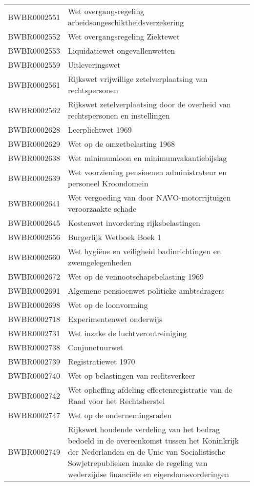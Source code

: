 \begin{longtable}{lp{}}
BWBR0002551 & Wet overgangsregeling arbeidsongeschiktheidsverzekering \\
BWBR0002552 & Wet overgangsregeling Ziektewet \\
BWBR0002553 & Liquidatiewet ongevallenwetten \\
BWBR0002559 & Uitleveringswet \\
BWBR0002561 & Rijkswet vrijwillige zetelverplaatsing van rechtspersonen \\
BWBR0002562 & Rijkswet zetelverplaatsing door de overheid van rechtspersonen en instellingen \\
BWBR0002628 & Leerplichtwet 1969 \\
BWBR0002629 & Wet op de omzetbelasting 1968 \\
BWBR0002638 & Wet minimumloon en minimumvakantiebijslag \\
BWBR0002639 & Wet voorziening pensioenen administrateur en personeel Kroondomein \\
BWBR0002641 & Wet vergoeding van door NAVO-motorrijtuigen veroorzaakte schade \\
BWBR0002645 & Kostenwet invordering rijksbelastingen \\
BWBR0002656 & Burgerlijk Wetboek Boek 1 \\
BWBR0002660 & Wet hygiëne en veiligheid badinrichtingen en zwemgelegenheden \\
BWBR0002672 & Wet op de vennootschapsbelasting 1969 \\
BWBR0002691 & Algemene pensioenwet politieke ambtsdragers \\
BWBR0002698 & Wet op de loonvorming \\
BWBR0002718 & Experimentenwet onderwijs \\
BWBR0002731 & Wet inzake de luchtverontreiniging \\
BWBR0002738 & Conjunctuurwet \\
BWBR0002739 & Registratiewet 1970 \\
BWBR0002740 & Wet op belastingen van rechtsverkeer \\
BWBR0002742 & Wet opheffing afdeling effectenregistratie van de Raad voor het Rechtsherstel \\
BWBR0002747 & Wet op de ondernemingsraden \\
BWBR0002749 & Rijkswet houdende verdeling van het bedrag bedoeld in de overeenkomst tussen het Koninkrijk der Nederlanden en de Unie van Socialistische Sowjetrepublieken inzake de regeling van wederzijdse financiële en eigendomsvorderingen \\

\end{longtable}
